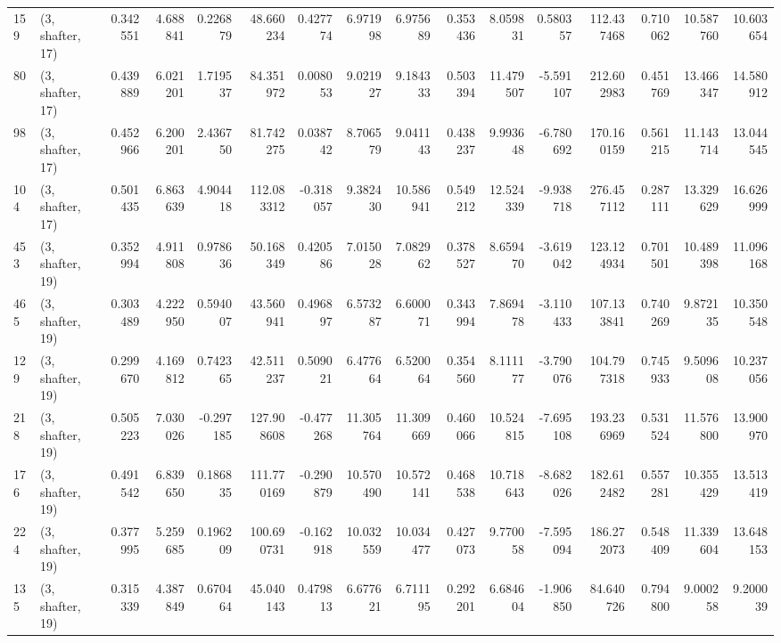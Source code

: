 \begin{tabular}{llrrrrrrrrrrrrrr}
159 &  (3, shafter, 17) &   0.342551 &   4.688841 &   0.226879 &    48.660234 &   0.427774 &   6.971998 &   6.975689 &  0.353436 &   8.059831 &   0.580357 &   112.437468 &   0.710062 &  10.587760 &  10.603654 \\
80  &  (3, shafter, 17) &   0.439889 &   6.021201 &   1.719537 &    84.351972 &   0.008053 &   9.021927 &   9.184333 &  0.503394 &  11.479507 &  -5.591107 &   212.602983 &   0.451769 &  13.466347 &  14.580912 \\
98  &  (3, shafter, 17) &   0.452966 &   6.200201 &   2.436750 &    81.742275 &   0.038742 &   8.706579 &   9.041143 &  0.438237 &   9.993648 &  -6.780692 &   170.160159 &   0.561215 &  11.143714 &  13.044545 \\
104 &  (3, shafter, 17) &   0.501435 &   6.863639 &   4.904418 &   112.083312 &  -0.318057 &   9.382430 &  10.586941 &  0.549212 &  12.524339 &  -9.938718 &   276.457112 &   0.287111 &  13.329629 &  16.626999 \\
453 &  (3, shafter, 19) &   0.352994 &   4.911808 &   0.978636 &    50.168349 &   0.420586 &   7.015028 &   7.082962 &  0.378527 &   8.659470 &  -3.619042 &   123.124934 &   0.701501 &  10.489398 &  11.096168 \\
465 &  (3, shafter, 19) &   0.303489 &   4.222950 &   0.594007 &    43.560941 &   0.496897 &   6.573287 &   6.600071 &  0.343994 &   7.869478 &  -3.110433 &   107.133841 &   0.740269 &   9.872135 &  10.350548 \\
129 &  (3, shafter, 19) &   0.299670 &   4.169812 &   0.742365 &    42.511237 &   0.509021 &   6.477664 &   6.520064 &  0.354560 &   8.111177 &  -3.790076 &   104.797318 &   0.745933 &   9.509608 &  10.237056 \\
218 &  (3, shafter, 19) &   0.505223 &   7.030026 &  -0.297185 &   127.908608 &  -0.477268 &  11.305764 &  11.309669 &  0.460066 &  10.524815 &  -7.695108 &   193.236969 &   0.531524 &  11.576800 &  13.900970 \\
176 &  (3, shafter, 19) &   0.491542 &   6.839650 &   0.186835 &   111.770169 &  -0.290879 &  10.570490 &  10.572141 &  0.468538 &  10.718643 &  -8.682026 &   182.612482 &   0.557281 &  10.355429 &  13.513419 \\
224 &  (3, shafter, 19) &   0.377995 &   5.259685 &   0.196209 &   100.690731 &  -0.162918 &  10.032559 &  10.034477 &  0.427073 &   9.770058 &  -7.595094 &   186.272073 &   0.548409 &  11.339604 &  13.648153 \\
135 &  (3, shafter, 19) &   0.315339 &   4.387849 &   0.670464 &    45.040143 &   0.479813 &   6.677621 &   6.711195 &  0.292201 &   6.684604 &  -1.906850 &    84.640726 &   0.794800 &   9.000258 &   9.200039 \\

\end{tabular}
